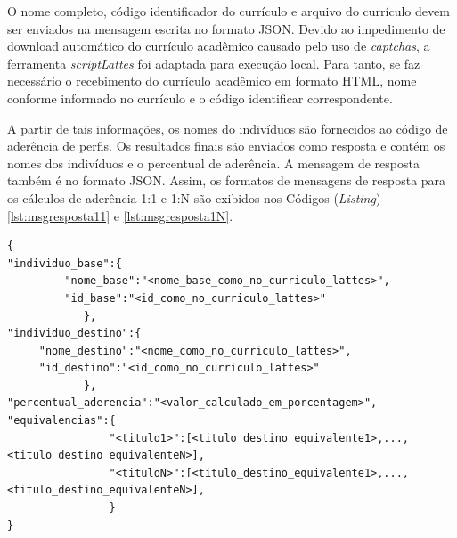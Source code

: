 O nome completo, código identificador do currículo e arquivo do currículo devem ser enviados na mensagem escrita no formato JSON. Devido ao impedimento de download automático do currículo acadêmico causado pelo uso de \textit{captchas}, a ferramenta \textit{scriptLattes} foi adaptada para execução local. Para tanto, se faz necessário o recebimento do currículo acadêmico em formato HTML, nome conforme informado no currículo e o código identificar correspondente.

A partir de tais informações, os nomes do indivíduos são fornecidos ao código de aderência de perfis. Os resultados finais são enviados como resposta e contém os nomes dos indivíduos e o percentual de aderência. A mensagem de resposta também é no formato JSON. Assim, os formatos de mensagens de resposta para os cálculos de aderência 1:1 e 1:N são exibidos nos Códigos (\textit{Listing}) \ref{lst:msgresposta11} e \ref{lst:msgresposta1N}.



\begin{lstlisting}[caption={Formato de mensagem de resposta(1:1).},label={lst:msgresposta11}]
{
"individuo_base":{
         "nome_base":"<nome_base_como_no_curriculo_lattes>",
         "id_base":"<id_como_no_curriculo_lattes>"
            },
"individuo_destino":{
     "nome_destino":"<nome_como_no_curriculo_lattes>",
     "id_destino":"<id_como_no_curriculo_lattes>"
            },
"percentual_aderencia":"<valor_calculado_em_porcentagem>",
"equivalencias":{
				"<titulo1>":[<titulo_destino_equivalente1>,...,<titulo_destino_equivalenteN>],
				"<tituloN>":[<titulo_destino_equivalente1>,...,<titulo_destino_equivalenteN>],
				}
}


\end{lstlisting}




